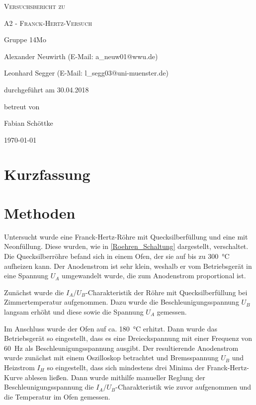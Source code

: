 \documentclass[
	a4paper,
	12pt,
	pagesize,
	ngerman
]{scrartcl}
\begin{document}
	
	\begin{titlepage}
		\centering
		{\scshape\LARGE Versuchsbericht zu \par}
		\vspace{1cm}
		{\scshape\huge A2 - Franck-Hertz-Versuch \par} 
		\vspace{2.5cm}
		{\LARGE Gruppe 14Mo \par}
		\vspace{0.5cm}
		
		{\large Alexander Neuwirth (E-Mail: a\_neuw01@wwu.de) \par}
		{\large Leonhard Segger (E-Mail: l\_segg03@uni-muenster.de) \par}
		\vfill
		
		durchgeführt am 30.04.2018\par
		betreut von\par
		{\large Fabian Schöttke}
		
		\vfill
		
		{\large \today\par}
	\end{titlepage}
	\tableofcontents
	\newpage


	\section{Kurzfassung}
	
	\section{Methoden}
	Untersucht wurde eine Franck-Hertz-Röhre mit Quecksilberfüllung und eine mit Neonfüllung.
	Diese wurden, wie in  \cref{Roehren_Schaltung} dargestellt, verschaltet. %
	Die Quecksilberröhre befand sich in einem Ofen, der sie auf bis zu \SI{300}{\degreeCelsius} aufheizen kann.
	Der Anodenstrom ist sehr klein, weshalb er vom Betriebsgerät in eine Spannung $U_A$ umgewandelt wurde, die zum Anodenstrom proportional ist.
	
	Zunächst wurde die $I_A/U_B$-Charakteristik der Röhre mit Quecksilberfüllung bei Zimmertemperatur aufgenommen.
	Dazu wurde die Beschleunigungsspannung $U_B$ langsam erhöht und diese sowie die Spannung $U_A$ gemessen.
	
	Im Anschluss wurde der Ofen auf ca. \SI{180}{\degreeCelsius} erhitzt.
	Dann wurde das Betriebsgerät so eingestellt, dass es eine Dreieckspannung mit einer Frequenz von \SI{60}{\hertz} als Beschleunigungsspannung ausgibt.
	Der resultierende Anodenstrom wurde zunächst mit einem Oszilloskop betrachtet und Bremsspannung $U_B$ und Heizstrom $I_H$ so eingestellt, dass sich mindestens drei Minima der Franck-Hertz-Kurve ablesen ließen.
	Dann wurde mithilfe manueller Reglung der Beschleunigungsspannung die $I_A/U_B$-Charakteristik wie zuvor aufgenommen und die Temperatur im Ofen gemessen.
	
\end{document}

